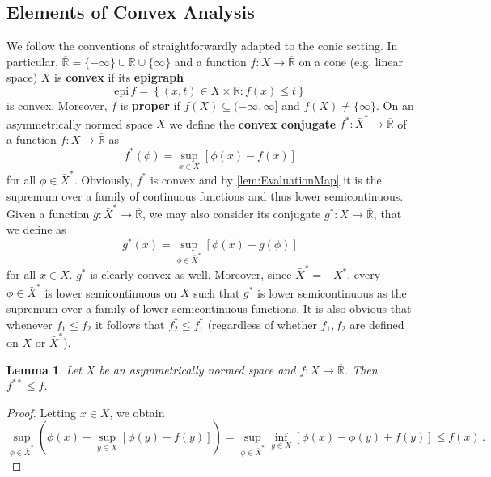 \documentclass[
	paper=A4,
	pagesize=auto,
	fontsize=12pt
]{scrartcl}
\theoremstyle{plain}
\newtheorem{lemma}[theorem]{Lemma}
\theoremstyle{remark}
\theoremstyle{definition}
\begin{document}
\subsection{Elements of Convex Analysis}
%
We follow the conventions of \cite{src:Zalinescu:ConvexAnalysisInGeneralVectorSpaces} straightforwardly adapted to the conic setting.
In particular, $\overline{\mathbb{R}} = \{ -\infty \} \cup \mathbb{R} \cup \{ \infty \}$ and a function $f : X \to \overline{\mathbb{R}}$ on a cone (e.g. linear space) $X$ is \textbf{convex} if its \textbf{epigraph}
%
\begin{equation}
\mathrm{epi}\, f = \left\{ (x, t) \in X \times \mathbb{R} : f \left( x \right) \le t \right\}
\end{equation}
%
is convex.
Moreover, $f$ is \textbf{proper} if $f(X) \subseteq (-\infty, \infty]$ and $f(X) \neq \{ \infty \}$.
%
On an asymmetrically normed space $X$ we define the \textbf{convex conjugate} $f^* : \bar{X}^* \to \overline{\mathbb{R}}$ of a function $f : X \to \overline{\mathbb{R}}$ as
%
\begin{equation}
f^* \left( \phi \right)
=
\sup_{x \in X} \left[ \phi \left( x \right) - f \left( x \right) \right]
\end{equation}
%
for all $\phi \in \bar{X}^*$.
Obviously, $f^*$ is convex and by \cref{lem:EvaluationMap} it is the supremum over a family of continuous functions and thus lower semicontinuous.
Given a function $g : \bar{X}^* \to \overline{\mathbb{R}}$, we may also consider its conjugate $g^* : X \to \overline{\mathbb{R}}$, that we define as
%
\begin{equation}
g^* \left( x \right)
=
\sup_{\phi \in \bar{X}^*} \left[ \phi \left( x \right) - g \left( \phi \right) \right]
\end{equation}
%
for all $x \in X$.
$g^*$ is clearly convex as well.
Moreover, since $\bar{X}^* = - X^*$, every $\phi \in \bar{X}^*$ is lower semicontinuous on $X$ such that $g^*$ is lower semicontinuous as the supremum over a family of lower semicontinuous functions.
It is also obvious that whenever $f_1 \le f_2$ it follows that $f_2^* \le f_1^*$ (regardless of whether $f_1, f_2$ are defined on $X$ or $\bar{X}^*$).
%
\begin{lemma}
\label{lem:DoubleConjugateIsSmaller}
Let $X$ be an asymmetrically normed space and $f : X \to \overline{\mathbb{R}}$.
Then $f^{**} \le f$.
\end{lemma}
\begin{proof}
Letting $x \in X$, we obtain
%
\begin{equation}
\sup_{\phi \in \bar{X}^*} \left(
\phi \left( x \right)
-
\sup_{y \in X} \left[
\phi \left( y \right)
-
f \left( y \right)
\right]
\right)
=
\sup_{\phi \in \bar{X}^*} 
\inf_{y \in X} \left[
\phi \left( x \right)
-
\phi \left( y \right)
+
f \left( y \right)
\right]
\le
f \left( x \right) \, .
\end{equation}
\end{proof}
%
\end{document}

